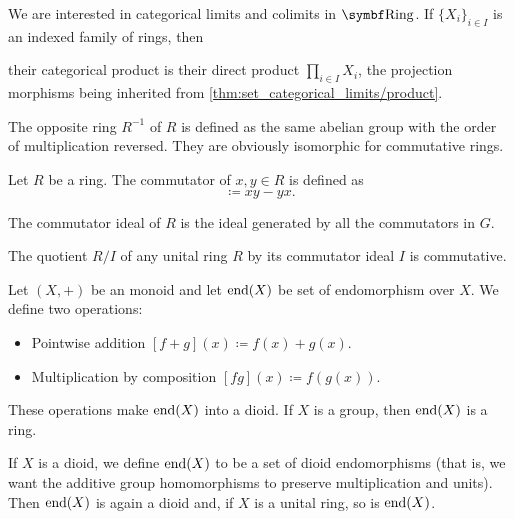 \begin{proposition}\label{thm:ring_categorical_limits}
  We are interested in categorical limits and colimits in \( \Cat{Ring} \). If \( \{ X_i \}_{i \in I} \) is an indexed family of rings, then
  \begin{defenum}
     their categorical product is their direct product \( \prod_{i \in I} X_i \), the projection morphisms being inherited from \cref{thm:set_categorical_limits/product}.
  \end{defenum}
\end{proposition}

\begin{definition}\label{def:opposite_ring}\cite[555]{Knapp2016BAlg}
  The opposite ring \( R^{-1} \) of \( R \) is defined as the same abelian group with the order of multiplication reversed. They are obviously isomorphic for commutative rings.
\end{definition}

\begin{definition}\label{def:ring_commutator}
  Let \( R \) be a ring. The commutator of \( x, y \in R \) is defined as
  \begin{equation*}
    [x, y] \coloneqq xy - yx.
  \end{equation*}

  The commutator ideal of \( R \) is the ideal generated by all the commutators in \( G \).
\end{definition}

\begin{proposition}\label{thm:quotient_by_commutator_ideal}
  The quotient \( R / I \) of any unital ring \( R \) by its commutator ideal \( I \) is commutative.
\end{proposition}

\begin{definition}\label{def:endomorphism_dioid}
  Let \( (X, +) \) be an monoid and let \( \operatorname{end}(X) \) be set of endomorphism over \( X \). We define two operations:
  \begin{itemize}
    \item Pointwise addition \( [f + g](x) \coloneqq f(x) + g(x) \).
    \item Multiplication by composition \( [fg](x) \coloneqq f(g(x)) \).
  \end{itemize}

  These operations make \( \operatorname{end}(X) \) into a dioid. If \( X \) is a group, then \( \operatorname{end}(X) \) is a ring.

  If \( X \) is a dioid, we define \( \operatorname{end}(X) \) to be a set of dioid endomorphisms (that is, we want the additive group homomorphisms to preserve multiplication and units). Then \( \operatorname{end}(X) \) is again a dioid and, if \( X \) is a unital ring, so is \( \operatorname{end}(X) \).
\end{definition}

